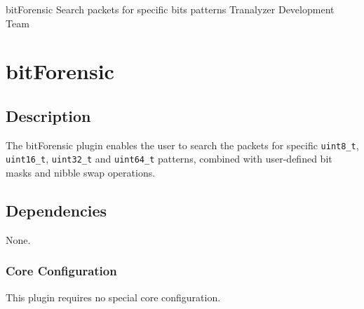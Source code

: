 \documentclass[documentation]{subfiles}
\begin{document}
\trantitle
    {bitForensic} %
    {Search packets for specific bits patterns} %
    {Tranalyzer Development Team} %

\section{bitForensic}\label{s:bitForensic}

\subsection{Description}
The bitForensic plugin enables the user to search the packets for specific {\tt uint8\_t},
{\tt uint16\_t}, {\tt uint32\_t} and {\tt uint64\_t} patterns, combined with user-defined
bit masks and nibble swap operations.

\subsection{Dependencies}
None.

\subsubsection{Core Configuration}
This plugin requires no special core configuration.
\end{document}
